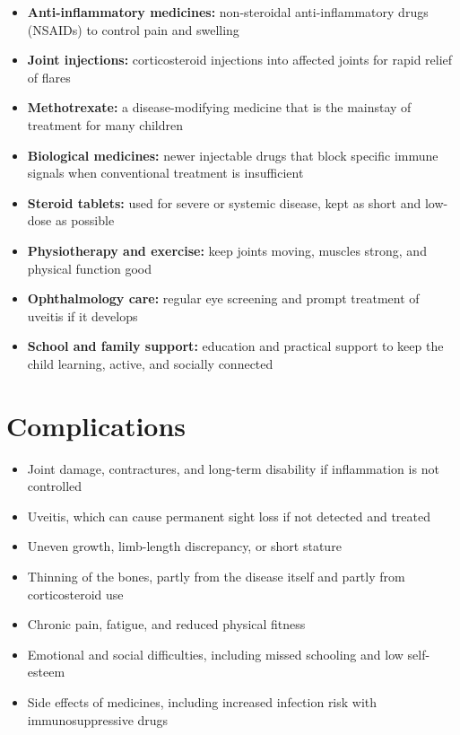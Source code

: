\begin{itemize}
    \item \textbf{Anti-inflammatory medicines:} non-steroidal anti-inflammatory drugs (NSAIDs) to control pain and swelling
    \item \textbf{Joint injections:} corticosteroid injections into affected joints for rapid relief of flares
    \item \textbf{Methotrexate:} a disease-modifying medicine that is the mainstay of treatment for many children
    \item \textbf{Biological medicines:} newer injectable drugs that block specific immune signals when conventional treatment is insufficient
    \item \textbf{Steroid tablets:} used for severe or systemic disease, kept as short and low-dose as possible
    \item \textbf{Physiotherapy and exercise:} keep joints moving, muscles strong, and physical function good
    \item \textbf{Ophthalmology care:} regular eye screening and prompt treatment of uveitis if it develops
    \item \textbf{School and family support:} education and practical support to keep the child learning, active, and socially connected
\end{itemize}

\section*{Complications}
\begin{itemize}
    \item Joint damage, contractures, and long-term disability if inflammation is not controlled
    \item Uveitis, which can cause permanent sight loss if not detected and treated
    \item Uneven growth, limb-length discrepancy, or short stature
    \item Thinning of the bones, partly from the disease itself and partly from corticosteroid use
    \item Chronic pain, fatigue, and reduced physical fitness
    \item Emotional and social difficulties, including missed schooling and low self-esteem
    \item Side effects of medicines, including increased infection risk with immunosuppressive drugs
\end{itemize}

